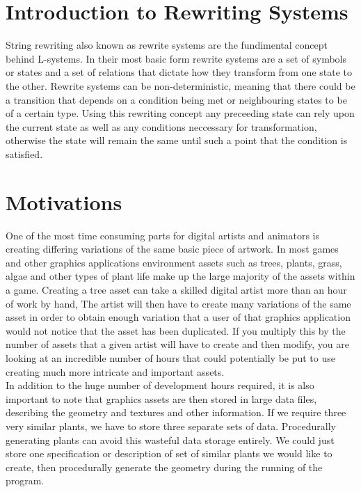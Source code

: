 \section{Introduction to Rewriting Systems}

\begin{flushleft}

String rewriting also known as rewrite systems are the fundimental concept behind L-systems. In their most basic form rewrite systems are a set of symbols or states and a set of relations that dictate how they transform from one state to the other. Rewrite systems can be non-deterministic, meaning that there could be a transition that depends on a condition being met or neighbouring states to be of a certain type. Using this rewriting concept any preceeding state can rely upon the current state as well as any conditions neccessary for transformation, otherwise the state will remain the same until such a point that the condition is satisfied. 

\end{flushleft}

\section{Motivations}
 
\begin{flushleft}
One of the most time consuming parts for digital artists and animators is creating differing variations of the same basic piece of artwork. In most games and other graphics applications environment assets such as trees, plants, grass, algae and other types of plant life make up the large majority of the assets within a game. Creating a tree asset can take a skilled digital artist more than an hour of work by hand, The artist will then have to create many variations of the same asset in order to obtain enough variation that a user of that graphics application would not notice that the asset has been duplicated. If you multiply this by the number of assets that a given artist will have to create and then modify, you are looking at an incredible number of hours that could potentially be put to use creating much more intricate and important assets.\\
\vspace{5mm}
In addition to the huge number of development hours required, it is also important to note that graphics assets are then stored in large data files, describing the geometry and textures and other information. If we require three very similar plants, we have to store three separate sets of data. Procedurally generating plants can avoid this wasteful data storage entirely. We could just store one specification or description of set of similar plants we would like to create, then procedurally generate the geometry during the running of the program.\\
\end{flushleft}

